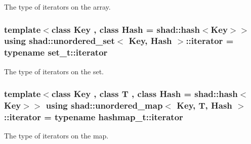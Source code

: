 The type of iterators on the array. 

\hypertarget{group__Types_gadbad50ac069a38bd820c0a9f532f903e}{
\subsubsection[{iterator}]{\setlength{\rightskip}{0pt plus 5cm}template$<$class Key , class Hash  = shad\-::hash$<$\-Key$>$$>$ using {\bf shad\-::unordered\-\_\-set}$<$ Key, Hash $>$\-::iterator =  typename set\-\_\-t\-::iterator}}\label{group__Types_gadbad50ac069a38bd820c0a9f532f903e}


The type of iterators on the set. 

\hypertarget{group__Types_gab52d604c26835c20a0363f9affa7ff57}{
\subsubsection[{iterator}]{\setlength{\rightskip}{0pt plus 5cm}template$<$class Key , class T , class Hash  = shad\-::hash$<$\-Key$>$$>$ using {\bf shad\-::unordered\-\_\-map}$<$ Key, T, Hash $>$\-::iterator =  typename hashmap\-\_\-t\-::iterator}}\label{group__Types_gab52d604c26835c20a0363f9affa7ff57}


The type of iterators on the map. 

